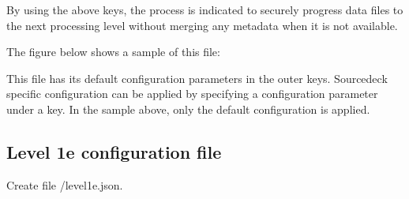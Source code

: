 \documentclass[letterpaper,10pt,english]{sphinxmanual}
\begin{document}
By using the above keys, the process is indicated to securely progress data files
to the next processing level without merging any metadata when it is not available.

The figure below shows a sample of this file:

\begin{sphinxVerbatim}[commandchars=\\\{\}]
   
   
   
    
    
    
    
\end{sphinxVerbatim}

This file has its default configuration parameters in the outer keys.
Source\sphinxhyphen{}deck specific configuration can be applied by specifying a configuration
parameter under a  key. In the sample above, only the default
configuration is applied.


\subsection{Level 1e configuration file}
\label{\detokenize{index:level-1e-configuration-file}}\label{\detokenize{index:level1e-config-file}}
Create file /level1e.json.
\end{document}
